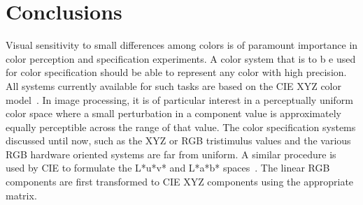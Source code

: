 \documentclass[10pt,twocolumn,letterpaper]{article}
\begin{document}
\section{Conclusions}

Visual sensitivity to small differences among colors is of paramount importance in color perception and specification experiments. A color system that is to b e used for color specification should be able to represent any color with high precision. All systems currently available for such tasks are based on the CIE XYZ color model~\cite{Ibraheem2012Understanding}. In image processing, it is of particular interest in a perceptually uniform color space where a small perturbation in a component value is approximately equally perceptible across the range of that value. The color specification systems discussed until now, such as the XYZ or RGB tristimulus values and the various RGB hardware oriented systems are far from uniform. A similar procedure is used by CIE to formulate the L*u*v* and L*a*b* spaces~\cite{Pinero2002Segmentation}. The linear RGB components are first transformed to CIE XYZ components using the appropriate matrix.
{\small


}
\end{document}
